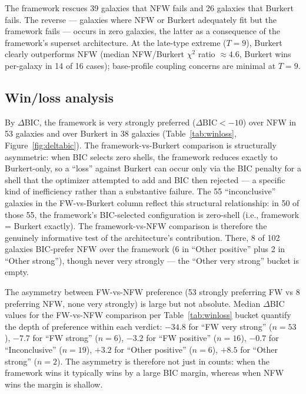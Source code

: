 \documentclass[linenumbers]{aastex701}
\begin{document}
The framework rescues 39 galaxies that NFW fails and 26 galaxies that Burkert fails. The reverse --- galaxies where NFW or Burkert adequately fit but the framework fails --- occurs in zero galaxies, the latter as a consequence of the framework's superset architecture. At the late-type extreme ($T=9$), Burkert clearly outperforms NFW (median NFW/Burkert $\chi^2$ ratio $\approx 4.6$, Burkert wins per-galaxy in 14 of 16 cases); base-profile coupling concerns are minimal at $T=9$.

\subsection{Win/loss analysis}\label{sec:winloss}

By $\Delta$BIC, the framework is very strongly preferred ($\Delta\mathrm{BIC} < -10$) over NFW in 53 galaxies and over Burkert in 38 galaxies (Table~\ref{tab:winloss}, Figure~\ref{fig:deltabic}). The framework-vs-Burkert comparison is structurally asymmetric: when BIC selects zero shells, the framework reduces exactly to Burkert-only, so a ``loss'' against Burkert can occur only via the BIC penalty for a shell that the optimizer attempted to add and BIC then rejected --- a specific kind of inefficiency rather than a substantive failure. The 55 ``inconclusive'' galaxies in the FW-vs-Burkert column reflect this structural relationship: in 50 of those 55, the framework's BIC-selected configuration is zero-shell (i.e., framework = Burkert exactly). The framework-vs-NFW comparison is therefore the genuinely informative test of the architecture's contribution. There, 8 of 102 galaxies BIC-prefer NFW over the framework (6 in ``Other positive'' plus 2 in ``Other strong''), though never very strongly --- the ``Other very strong'' bucket is empty.

The asymmetry between FW-vs-NFW preference (53 strongly preferring FW vs 8 preferring NFW, none very strongly) is large but not absolute. Median $\Delta$BIC values for the FW-vs-NFW comparison per Table~\ref{tab:winloss} bucket quantify the depth of preference within each verdict: $-34.8$ for ``FW very strong'' ($n=53$), $-7.7$ for ``FW strong'' ($n=6$), $-3.2$ for ``FW positive'' ($n=16$), $-0.7$ for ``Inconclusive'' ($n=19$), $+3.2$ for ``Other positive'' ($n=6$), $+8.5$ for ``Other strong'' ($n=2$). The asymmetry is therefore not just in counts: when the framework wins it typically wins by a large BIC margin, whereas when NFW wins the margin is shallow.
\end{document}

